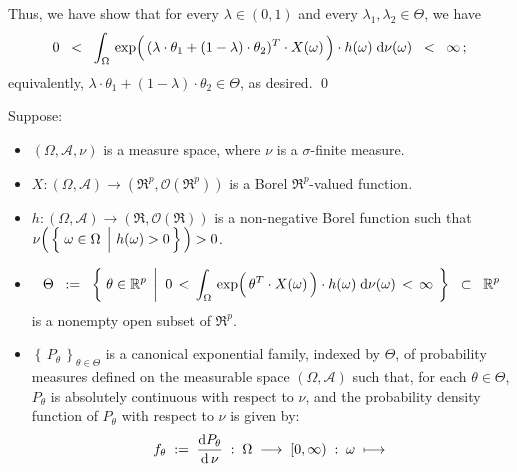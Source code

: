 Thus, we have show that for every $\lambda \in (0,1)$ and every $\lambda_{1}, \lambda_{2} \in \Theta$, we have
\begin{equation*}
0 \;\; < \;\;
	\int_{\Omega}\,
		\exp\!\left(\,
			(\lambda\cdot\theta_{1}+(1-\lambda)\cdot\theta_{2})^{T}
			\!\overset{{\color{white}-}}{\cdot}\!
			X(\omega)
		\,\right)
		\cdot
	 	h(\omega)
	\;\d\nu(\omega)
\;\; < \;\; \infty\,;
\end{equation*}
equivalently, $\lambda\cdot\theta_{1}+(1-\lambda)\cdot\theta_{2} \in \Theta$, as desired.
\qed


\begin{theorem}
\mbox{}\vskip 0.1cm
\noindent
Suppose:
\begin{itemize}
\item
	$(\Omega,\mathcal{A},\nu)$ is a measure space, where $\nu$ is a $\sigma$-finite measure.
\item
	$X : (\Omega,\mathcal{A}) \longrightarrow (\Re^{p},\mathcal{O}(\Re^{p}))$
	is a Borel $\Re^{p}$-valued function.
\item
	$h : (\Omega,\mathcal{A}) \longrightarrow (\Re,\mathcal{O}(\Re))$
	is a non-negative Borel function such that
	\,$\nu\!\left(\,\left\{\,\left.\omega\overset{{\color{white}.}}{\in}\Omega\,\;\right\vert\,h(\omega) > 0\,\right\}\,\right) > 0$.
\item
	\begin{equation*}
	\Theta
	\;\; := \;\;
		\left\{\;
			\theta \in \Re^{p}
			\;\left\vert\;\;
			0 \, < \,
			\int_{\Omega}\,
				\exp\!\left(\,\theta^{T} \!\overset{{\color{white}-}}{\cdot}\! X(\omega)\,\right) \cdot h(\omega)
			\;\d\nu(\omega)
			\, < \, \infty
			\right.
		\;\right\}
	\;\; \subset \;\; \Re^{p}
	\end{equation*}
	is a nonempty open subset of $\Re^{p}$.
\item
	$\left\{\,P_{\theta}\,\right\}_{\theta \in \Theta}$ is a canonical exponential family, indexed by $\Theta$,
	of probability measures defined on the measurable space $(\Omega,\mathcal{A})$ such that,
	for each $\theta \in \Theta$, $P_{\theta}$ is absolutely continuous with respect to $\nu$, and
	the probability density function of $P_{\theta}$ with respect to $\nu$ is given by:
	\begin{equation*}
	f_{\theta} \; := \; \dfrac{\d P_{\theta}}{\d\,\nu}
	\; : \; \Omega \; \longrightarrow \; [0,\infty) \; : \;
	\omega \; \longmapsto \;

\end{equation*}
\end{itemize}
\end{theorem}

